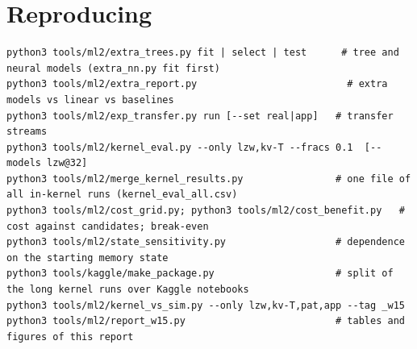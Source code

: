 \documentclass[10.5pt,a4paper]{article}
\begin{document}
\section*{Reproducing}
\small
\begin{verbatim}
python3 tools/ml2/extra_trees.py fit | select | test      # tree and neural models (extra_nn.py fit first)
python3 tools/ml2/extra_report.py                          # extra models vs linear vs baselines
python3 tools/ml2/exp_transfer.py run [--set real|app]   # transfer streams
python3 tools/ml2/kernel_eval.py --only lzw,kv-T --fracs 0.1  [--models lzw@32]
python3 tools/ml2/merge_kernel_results.py                # one file of all in-kernel runs (kernel_eval_all.csv)
python3 tools/ml2/cost_grid.py; python3 tools/ml2/cost_benefit.py   # cost against candidates; break-even
python3 tools/ml2/state_sensitivity.py                   # dependence on the starting memory state
python3 tools/kaggle/make_package.py                     # split of the long kernel runs over Kaggle notebooks
python3 tools/ml2/kernel_vs_sim.py --only lzw,kv-T,pat,app --tag _w15
python3 tools/ml2/report_w15.py                          # tables and figures of this report
\end{verbatim}
\end{document}
